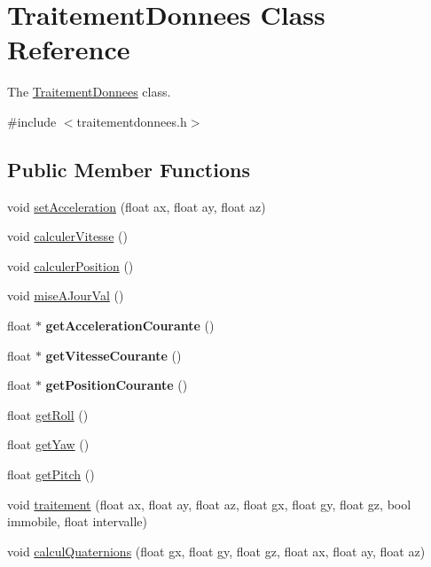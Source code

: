\hypertarget{classTraitementDonnees}{\section{Traitement\-Donnees Class Reference}
\label{classTraitementDonnees}
}


The \hyperlink{classTraitementDonnees}{Traitement\-Donnees} class.  




{\ttfamily \#include $<$traitementdonnees.\-h$>$}

\subsection*{Public Member Functions}
\begin{DoxyCompactItemize}
\item 
void \hyperlink{classTraitementDonnees_a26e84d4ff8b228448fa4341a0f626810}{set\-Acceleration} (float ax, float ay, float az)
\item 
void \hyperlink{classTraitementDonnees_aae3b3983aebcc36db7519e3d4c9defc8}{calculer\-Vitesse} ()
\item 
void \hyperlink{classTraitementDonnees_a0658a30ce0080052590f43175678b1a3}{calculer\-Position} ()
\item 
void \hyperlink{classTraitementDonnees_a47d3b55731475591334af21c15bf0faa}{mise\-A\-Jour\-Val} ()
\item 
\hypertarget{classTraitementDonnees_a7d25ee8242fd6c5e3dfa0c168a881930}{float $\ast$ {\bfseries get\-Acceleration\-Courante} ()}\label{classTraitementDonnees_a7d25ee8242fd6c5e3dfa0c168a881930}

\item 
\hypertarget{classTraitementDonnees_aa0f3af6b3031701f8500efc9d22c10db}{float $\ast$ {\bfseries get\-Vitesse\-Courante} ()}\label{classTraitementDonnees_aa0f3af6b3031701f8500efc9d22c10db}

\item 
\hypertarget{classTraitementDonnees_a97add932d94c275e7fac5682653802f7}{float $\ast$ {\bfseries get\-Position\-Courante} ()}\label{classTraitementDonnees_a97add932d94c275e7fac5682653802f7}

\item 
float \hyperlink{classTraitementDonnees_a81ffbc75f47488f0e4bbfbff13aeff0c}{get\-Roll} ()
\item 
float \hyperlink{classTraitementDonnees_ad7f0fe073028f88d5520bd30ddef0fd5}{get\-Yaw} ()
\item 
float \hyperlink{classTraitementDonnees_a0c0db9953a514fdef8c2155ea0f2555f}{get\-Pitch} ()
\item 
void \hyperlink{classTraitementDonnees_a3b399278ae62f30b2faeedf89dd26094}{traitement} (float ax, float ay, float az, float gx, float gy, float gz, bool immobile, float intervalle)
\item 
void \hyperlink{classTraitementDonnees_abae534e845da998de4cce9a23df96433}{calcul\-Quaternions} (float gx, float gy, float gz, float ax, float ay, float az)
\end{DoxyCompactItemize}


